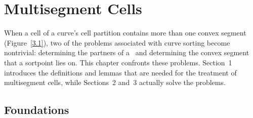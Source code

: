 \chapter{Multisegment Cells}
\label{chap-3}

When a cell of a curve's cell partition 
contains more than one convex segment (Figure~\ref{3.1}),
two of the problems associated
%
%
with curve sorting become nontrivial: determining the partners of a 
\wallpoint\ and determining the convex segment that a sortpoint lies on.
This chapter confronts these problems.
Section~1 introduces the definitions and lemmas that are needed for 
the treatment of multisegment cells,
while Sections~2 and~3 actually solve the problems.

\section{Foundations}
\label{sec-3.1}

%

